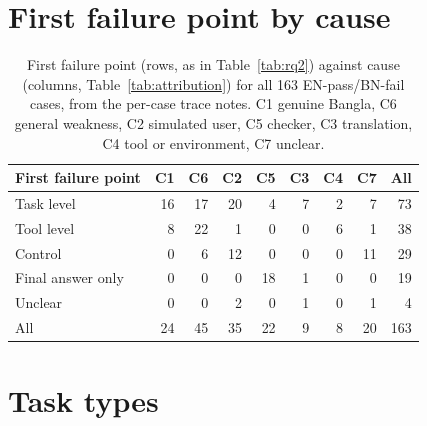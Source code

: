 \documentclass[11pt]{article}
\begin{document}
\section{First failure point by cause}
\label{app:stagecause}

\begin{table}[h]
\centering\footnotesize
\setlength{\tabcolsep}{2.6pt}
\begin{tabular}{lrrrrrrrr}
\toprule
First failure point & C1 & C6 & C2 & C5 & C3 & C4 & C7 & All \\
\midrule
Task level        & 16 & 17 & 20 & 4  & 7 & 2 & 7  & 73 \\
Tool level        & 8  & 22 & 1  & 0  & 0 & 6 & 1  & 38 \\
Control           & 0  & 6  & 12 & 0  & 0 & 0 & 11 & 29 \\
Final answer only & 0  & 0  & 0  & 18 & 1 & 0 & 0  & 19 \\
Unclear                            & 0  & 0  & 2  & 0  & 1 & 0 & 1  & 4 \\
\midrule
All                                & 24 & 45 & 35 & 22 & 9 & 8 & 20 & 163 \\
\bottomrule
\end{tabular}
\caption{First failure point (rows, as in Table~\ref{tab:rq2}) against cause (columns,
Table~\ref{tab:attribution}) for all 163 EN-pass/BN-fail cases, from the per-case trace notes.
C1 genuine Bangla, C6 general weakness, C2 simulated user, C5 checker, C3 translation, C4 tool or
environment, C7 unclear.}
\label{tab:stagecause}
\end{table}

\section{Task types}
\label{app:tasktypes}
\end{document}
